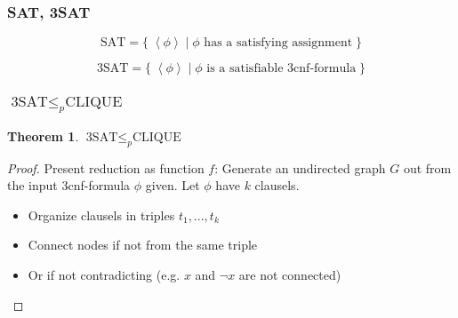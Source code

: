\documentclass[notheorems]{beamer}
\theoremstyle{definition}
\newtheorem{theorem}{Theorem}
\theoremstyle{remark}
\newcommand{\cliqueprob}{\text{CLIQUE}}
\newcommand{\satprob}{\text{SAT}}
\newcommand{\threesatprob}{\text{3SAT}}
\newcommand{\lpp}{\left \langle}
\newcommand{\rpp}{\right \rangle}
\newcommand{\enc}[1]{\lpp #1 \rpp}
\begin{document}
\begin{frame}
    \frametitle{SAT, 3SAT}

    \pause

    \[
        \satprob = \{ \;\enc{\phi} \mid \phi \text{ has a satisfying assignment} \; \}
    \]

    \pause

    \[
        \threesatprob = \{ \; \enc{\phi} \mid \phi \text{ is a satisfiable 3cnf-formula} \; \}
    \]

\end{frame}

\begin{frame}
    \frametitle{\(\threesatprob \leq_p \cliqueprob\)}

    \begin{theorem}
        \(\threesatprob \leq_p \cliqueprob\)
    \end{theorem}

    \pause

    \begin{proof} Present reduction as function \(f\): Generate an undirected graph \(G\) out from the input 3cnf-formula \(\phi\) given. Let \(\phi\) have \(k\) clausels.

        \begin{itemize}
            \item Organize clausels in triples \(t_1, ..., t_k\)
            \item Connect nodes if not from the same triple
            \item Or if not contradicting (e.g. \(x\) and \(\neg x\) are not connected)
        \end{itemize}
    \end{proof}

\end{frame}
\end{document}
